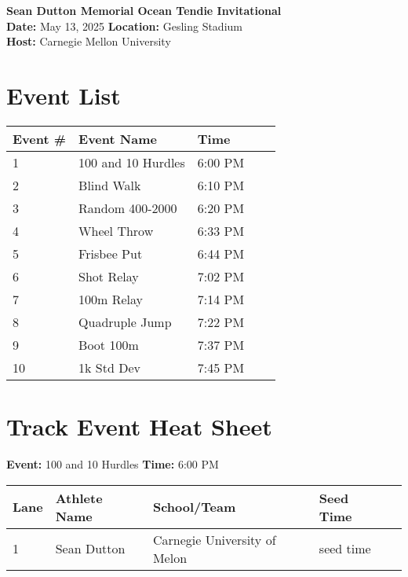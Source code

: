 \documentclass[11pt]{article}
\begin{document}
\begin{center}
    \LARGE \textbf{Sean Dutton Memorial Ocean Tendie Invitational} \\
    \large
    \vspace{0.5em}
    \textbf{Date:} May 13, 2025 \hspace{2cm} \textbf{Location:} Gesling Stadium \\
    \textbf{Host:} Carnegie Mellon University
\end{center}

\vspace{1em}

\section*{Event List}

\begin{tabular}{@{}lllll@{}}
\toprule
\textbf{Event \#} & \textbf{Event Name} &  \textbf{Time} \\
\midrule
1 & 100 and 10 Hurdles & 6:00 PM \\
2 & Blind Walk & 6:10 PM \\
3 & Random 400-2000 & 6:20 PM \\
4 & Wheel Throw & 6:33 PM \\
5 & Frisbee Put & 6:44 PM \\
6 & Shot Relay & 7:02 PM \\
7 & 100m Relay & 7:14 PM \\
8 & Quadruple Jump & 7:22 PM \\
9 & Boot 100m & 7:37 PM \\
10 & 1k Std Dev & 7:45 PM \\
\bottomrule
\end{tabular}



\vspace{2em}

\section*{Track Event Heat Sheet}


\textbf{Event:} 100 and 10 Hurdles \quad \textbf{Time:} 6:00 PM 

\vspace{1em}
\begin{tabular}{@{}lllll@{}}
\toprule
\textbf{Lane} & \textbf{Athlete Name} & \textbf{School/Team} & \textbf{Seed Time} \\
\midrule
1 & Sean Dutton & Carnegie University of Melon & seed time &\\
\bottomrule
\end{tabular}
\vspace{2.5em}
\end{document}

